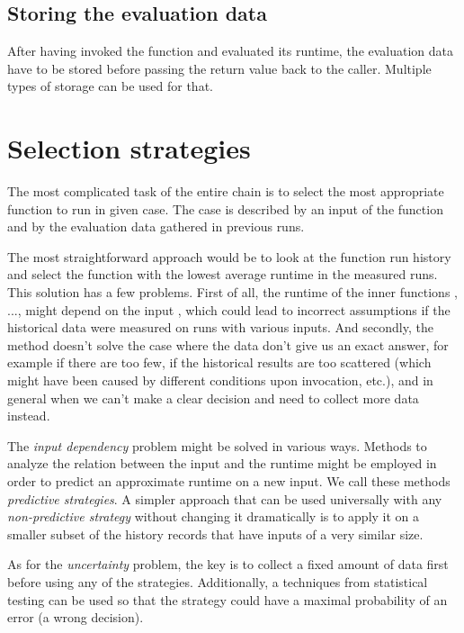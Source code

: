 \subsection{Storing the evaluation data}

After having invoked the function and evaluated its runtime, the evaluation data have to be stored before passing the return value back to the caller. Multiple types of storage can be used for that.


\section{Selection strategies}

The most complicated task of the entire chain is to select the most appropriate function to run in given case. The case is described by an input  of the function  and by the evaluation data gathered in previous runs.

The most straightforward approach would be to look at the function run history and select the function with the lowest average runtime in the measured runs. This solution has a few problems. First of all, the runtime of the inner functions , ...,  might depend on the input , which could lead to incorrect assumptions if the historical data were measured on runs with various inputs. And secondly, the method doesn't solve the case where the data don't give us an exact answer, for example if there are too few, if the historical results are too scattered (which might have been caused by different conditions upon invocation, etc.), and in general when we can't make a clear decision and need to collect more data instead.

The \textit{input dependency} problem might be solved in various ways. Methods to analyze the relation between the input and the runtime might be employed in order to predict an approximate runtime on a new input. We call these methods \textit{predictive strategies}. A simpler approach that can be used universally with any \textit{non-predictive strategy} without changing it dramatically is to apply it on a smaller subset of the history records that have inputs of a very similar size. 

As for the \textit{uncertainty} problem, the key is to collect a fixed amount of data first before using any of the strategies. Additionally, a techniques from statistical testing can be used so that the strategy could have a maximal probability of an error (a wrong decision).


